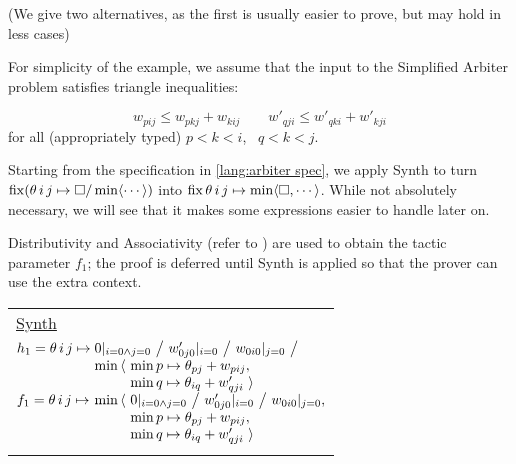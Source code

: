 (We give two alternatives, as the first is usually easier to prove, but may hold in less cases)

\newenvironment{tacticbox}[1]{\begin{center}\begin{tabular}{|@{~~~~}l@{~~~~}|}\hline\rule{0pt}{2.3ex}\underline{#1}\\[.4em]$}{$\\[-1em] \\[.3ex] \hline\end{tabular}\end{center}}

\noindent
\begin{minipage}{\columnwidth}
\exampleTitle \begin{comment}\subsection{Example}\end{comment}

For simplicity of the example, we assume that the input to the Simplified Arbiter problem
satisfies triangle inequalities:
\end{minipage}
%
\begin{equation}
w_{pij} \leq w_{pkj} + w_{kij} \qquad w'_{qji} \leq w'_{qki} + w'_{kji}
\label{equ:triangle}
\end{equation}
%
for all (appropriately typed) $p<k<i$, ~$q<k<j$.

\begin{comment}
\label{annex:more tactics} %
\end{comment}

\medskip
Starting from the specification in \eqref{lang:arbiter spec}, we apply Synth to turn
$\operatorname{fix} (\theta\,i\,j\mapsto\square/\min\langle\cdots\rangle)$ into $\operatorname{fix}\theta\,i\,j\mapsto\min\langle\square,\cdots\rangle$.
While not absolutely necessary, we will see that it makes some expressions easier to handle later
on.

Distributivity and Associativity (refer to ) are used to obtain the tactic parameter $f_1$;
the proof is deferred until Synth is applied so that the prover can use the extra context.

\begin{tacticbox}{Synth}
  \begin{array}{@{} l @{} l @{} l @{}}
       h_1=\theta\,i\,j\mapsto{}
	      & \lspan2{0|_{i=0\land j=0} ~\big/~ w'_{0j0}|_{i=0} ~\big/~ w_{0i0}|_{j=0} ~\big/~} \\
	      & \min\,\langle~ & \min p\mapsto\theta_{pj}+w_{pij}, \\
	      & & \min q\mapsto\theta_{iq}+w'_{qji} ~\rangle \\
       f_1=\theta\,i\,j\mapsto{}
	      & \min\,\langle~ & 0|_{i=0\land j=0} ~\big/~ w'_{0j0}|_{i=0} ~\big/~ w_{0i0}|_{j=0}, \\
	      & & \min p\mapsto\theta_{pj}+w_{pij}, \\
	      & & \min q\mapsto\theta_{iq}+w'_{qji} ~\rangle
  \end{array}
\end{tacticbox}

